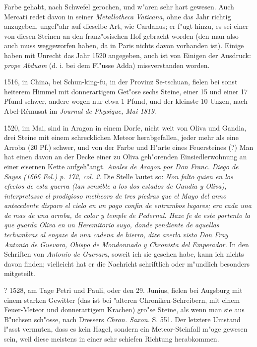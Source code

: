\documentclass[a4paper, 11pt, oneside, polutonikogreek, german]{article}
\begin{document}
Farbe gehabt, nach Schwefel gerochen, und w"aren sehr hart gewesen. Auch Mercati redet davon in seiner \emph{Metallotheca Vaticana}, ohne das Jahr richtig anzugeben, ungef"ahr auf dieselbe Art, wie Cardanus; er f"ugt hinzu, es sei einer von diesen Steinen an den franz"osischen Hof gebracht worden (den man also auch muss weggeworfen haben, da in Paris nichts davon vorhanden ist). Einige haben mit Unrecht das Jahr 1520 angegeben, auch ist von Einigen der Ausdruck: \emph{prope Abduam} (d. i. bei dem Fl"usse Adda) missverstanden worden.

1516, in China, bei Schun-king-fu, in der Provinz Se-tschuan, fielen bei sonst heiterem Himmel mit donnerartigem Get"ose sechs Steine, einer 15 und einer 17 Pfund schwer, andere wogen nur etwa 1 Pfund, und der kleinste 10 Unzen, nach Abel-Rémusat im \emph{Journal de Physique, Mai 1819}.

1520, im Mai, sind in Aragon in einem Dorfe, nicht weit von Oliva und Gandia, drei Steine mit einem schrecklichen Meteor herabgefallen, jeder mehr als eine Arroba (20 Pf.) schwer, und von der Farbe und H"arte eines Feuersteines (?) Man hat einen davon an der Decke einer zu Oliva geh"orenden Einsiedlerwohnung an einer eisernen Kette aufgeh"angt. \emph{Anales de Aragon por Don Franc. Diego de Sayes (1666 Fol.) p. 172, col. 2}. Die Stelle lautet so: \emph{Non falto quien en los efectos de esta guerra (tan sensible a los dos estados de Gandia y Oliva), interpretasse el prodigioso metheoro de tres piedras que el Mayo del anno antecedente disparo el cielo en un pago confin de entrambos lugares; era cada una de mas de una arroba, de color y temple de Pedernal. Haze fe de este portento la que guarda Oliva en un Heremitorio suyo, donde pendiente de aquellas techumbras al engaze de una cadena de hierro, dize averla visto Don Fray Antonio de Guevara, Obispo de Mondonnado y Chronista del Emperador.} In den Schriften von \emph{Antonio de Guevara}, soweit ich sie gesehen habe, kann ich nichts davon finden; vielleicht hat er die Nachricht schriftlich oder m"undlich besonders mitgeteilt.

? 1528, am Tage Petri und Pauli, oder den 29. Junius, fielen bei Augsburg mit einem starken Gewitter (das ist bei "alteren Chroniken-Schreibern, mit einem Feuer-Meteor und donnerartigem Krachen) gro"se Steine, als wenn man sie aus B"uchsen sch"osse, nach Dressers \emph{Chron. Saxon.} S. 551. Der letztere Umstand l"asst vermuten, dass es kein Hagel, sondern ein Meteor-Steinfall m"oge gewesen sein, weil diese meistens in einer sehr schiefen Richtung herabkommen.
\end{document}
